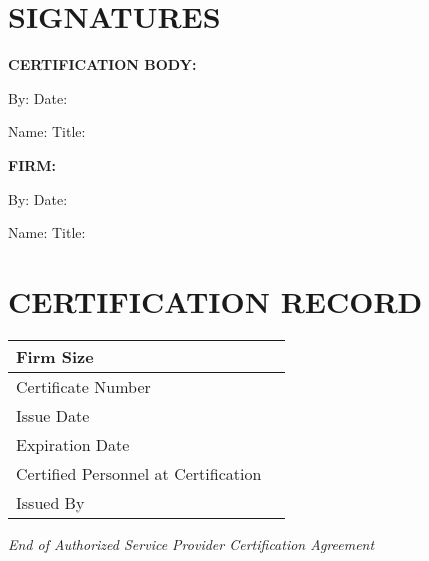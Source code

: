 \documentclass[11pt,a4paper]{article}
\begin{document}
\section*{SIGNATURES}

\textbf{CERTIFICATION BODY:}

By: \underline{\hspace{6cm}} Date: \underline{\hspace{3cm}}

Name: \underline{\hspace{6cm}} Title: \underline{\hspace{6cm}}

\vspace{2em}

\textbf{FIRM:}

By: \underline{\hspace{6cm}} Date: \underline{\hspace{3cm}}

Name: \underline{\hspace{6cm}} Title: \underline{\hspace{6cm}}

\vspace{2em}

\section*{CERTIFICATION RECORD}

\begin{tabular}{|l|p{10cm}|}
\hline
Firm Size & \\
\hline
Certificate Number & \\
\hline
Issue Date & \\
\hline
Expiration Date & \\
\hline
Certified Personnel at Certification & \\
\hline
Issued By & \\
\hline
\end{tabular}

\vspace{2em}

\begin{center}
\textit{End of Authorized Service Provider Certification Agreement}
\end{center}
\end{document}
